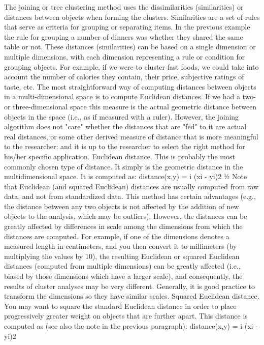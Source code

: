 The joining or tree clustering method uses the dissimilarities (similarities) or distances between objects when forming the clusters. Similarities are a set of rules that serve as criteria for grouping or separating items. In the previous example the rule for grouping a number of dinners was whether they shared the same table or not. These distances (similarities) can be based on a single dimension or multiple dimensions, with each dimension representing a rule or condition for grouping objects. For example, if we were to cluster fast foods, we could take into account the number of calories they contain, their price, subjective ratings of taste, etc. The most straightforward way of computing distances between objects in a multi-dimensional space is to compute Euclidean distances. If we had a two- or three-dimensional space this measure is the actual geometric distance between objects in the space (i.e., as if measured with a ruler). However, the joining algorithm does not "care" whether the distances that are "fed" to it are actual real distances, or some other derived measure of distance that is more meaningful to the researcher; and it is up to the researcher to select the right method for his/her specific application.
Euclidean distance. This is probably the most commonly chosen type of distance. It simply is the geometric distance in the multidimensional space. It is computed as:
distance(x,y) = {i (xi - yi)2 }½
Note that Euclidean (and squared Euclidean) distances are usually computed from raw data, and not from standardized data. This method has certain advantages (e.g., the distance between any two objects is not affected by the addition of new objects to the analysis, which may be outliers). However, the distances can be greatly affected by differences in scale among the dimensions from which the distances are computed. For example, if one of the dimensions denotes a measured length in centimeters, and you then convert it to millimeters (by multiplying the values by 10), the resulting Euclidean or squared Euclidean distances (computed from multiple dimensions) can be greatly affected (i.e., biased by those dimensions which have a larger scale), and consequently, the results of cluster analyses may be very different. Generally, it is good practice to transform the dimensions so they have similar scales.
Squared Euclidean distance. You may want to square the standard Euclidean distance in order to place progressively greater weight on objects that are further apart. This distance is computed as (see also the note in the previous paragraph):
distance(x,y) = i (xi - yi)2
